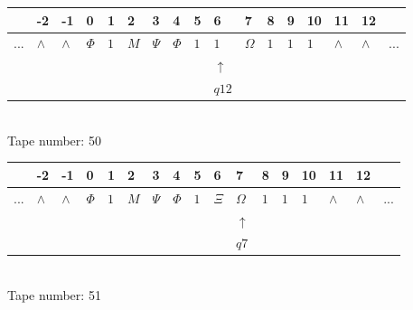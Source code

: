 \documentclass[11pt]{article}
\begin{document}
\begin{table}[H]
\centering
\begin{tabular}{lllllllllllllllll}
 & -2 & -1 & 0 & 1 & 2 & 3 & 4 & 5 & 6 & 7 & 8 & 9 & 10 & 11 & 12 & \\
\hline
$...$ & \multicolumn{1}{|l|}{$\wedge$} & \multicolumn{1}{|l|}{$\wedge$} & \multicolumn{1}{|l|}{$\Phi$} & \multicolumn{1}{|l|}{$1$} & \multicolumn{1}{|l|}{$M$} & \multicolumn{1}{|l|}{$\Psi$} & \multicolumn{1}{|l|}{$\Phi$} & \multicolumn{1}{|l|}{$1$} & \multicolumn{1}{|l|}{$1$} & \multicolumn{1}{|l|}{$\Omega$} & \multicolumn{1}{|l|}{$1$} & \multicolumn{1}{|l|}{$1$} & \multicolumn{1}{|l|}{$1$} & \multicolumn{1}{|l|}{$\wedge$} & \multicolumn{1}{|l|}{$\wedge$} & $...$\\
\hline
&  &  &  &  &  &  &  &  & $\uparrow$ &  &  &  &  &  &  &  \\
&  &  &  &  &  &  &  &  & $ q12 $ &  &  &  &  &  &  &  \\
\end{tabular}
\\
Tape number: 50
\noindent\makebox[\linewidth]{\hdashrule{\textwidth}{1pt}{1pt}}\end{table}

\begin{table}[H]
\centering
\begin{tabular}{lllllllllllllllll}
 & -2 & -1 & 0 & 1 & 2 & 3 & 4 & 5 & 6 & 7 & 8 & 9 & 10 & 11 & 12 & \\
\hline
$...$ & \multicolumn{1}{|l|}{$\wedge$} & \multicolumn{1}{|l|}{$\wedge$} & \multicolumn{1}{|l|}{$\Phi$} & \multicolumn{1}{|l|}{$1$} & \multicolumn{1}{|l|}{$M$} & \multicolumn{1}{|l|}{$\Psi$} & \multicolumn{1}{|l|}{$\Phi$} & \multicolumn{1}{|l|}{$1$} & \multicolumn{1}{|l|}{$\Xi$} & \multicolumn{1}{|l|}{$\Omega$} & \multicolumn{1}{|l|}{$1$} & \multicolumn{1}{|l|}{$1$} & \multicolumn{1}{|l|}{$1$} & \multicolumn{1}{|l|}{$\wedge$} & \multicolumn{1}{|l|}{$\wedge$} & $...$\\
\hline
&  &  &  &  &  &  &  &  &  & $\uparrow$ &  &  &  &  &  &  \\
&  &  &  &  &  &  &  &  &  & $ q7 $ &  &  &  &  &  &  \\
\end{tabular}
\\
Tape number: 51
\noindent\makebox[\linewidth]{\hdashrule{\textwidth}{1pt}{1pt}}\end{table}
\end{document}
